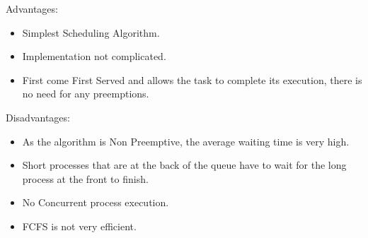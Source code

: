 \documentclass[12pt, conference]{IEEEtran}
\begin{document}
Advantages:
\begin{itemize}
    \item Simplest Scheduling Algorithm.
    \item Implementation not complicated.
    \item First come First Served and allows the task to complete its execution, there is no need for any preemptions.
\end{itemize}
Disadvantages:
\begin{itemize}
    \item As the algorithm is Non Preemptive, the average waiting time is very high.
    \item Short processes that are at the back of the queue have to wait for the long process at the front to finish.
    \item No Concurrent process execution.
    \item FCFS is not very efficient.
\end{itemize}
\end{document}
